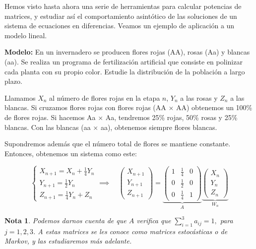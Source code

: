 \documentclass[11pt, a4paper]{article}
\newif\IfInSansMode
\numberwithin{equation}{section}
\theoremstyle{theorem-style}
\theoremstyle{definition-style}
\theoremstyle{remark-style}
\newtheorem*{nota}{Nota}
\theoremstyle{example-style}
\begin{document}
Hemos visto hasta ahora una serie de herramientas para calcular potencias de matrices, y estudiar así el comportamiento asintótico de las soluciones de un sistema de ecuaciones en diferencias. Veamos un ejemplo de aplicación a un modelo lineal.

\textbf{Modelo:} En un invernadero se producen flores rojas (AA), rosas (Aa) y blancas (aa). Se
realiza un programa de fertilización artificial que consiste en polinizar cada
planta con su propio color. Estudie la distribución de la población a largo
plazo.

Llamamos $X_n$ al número de flores rojas en la etapa $n$, $Y_n$ a las rosas y $Z_n$ a
las blancas. Si cruzamos flores rojas con flores rojas (AA $\times$ AA) obtenemos
un 100\% de flores rojas. Si hacemos Aa $\times$ Aa, tendremos 25\% rojas, 50\% rosas y
25\% blancas. Con las blancas (aa $\times$ aa), obtenemos siempre flores blancas.

Supondremos además que el número total de flores se mantiene constante. Entonces, obtenemos un sistema como este:

$$
\begin{cases}
  X_{n+1} = X_n + \frac{1}{4}Y_n \\
  Y_{n+1} = \frac{1}{2}Y_n \\
  Z_{n+1} = \frac{1}{4}Y_n + Z_n
\end{cases} \implies \quad \begin{pmatrix}
  X_{n+1} \\
  Y_{n+1} \\
  Z_{n+1}
\end{pmatrix} =
\underbrace{\begin{pmatrix}
  1 & \frac{1}{4} & 0 \\
  0 & \frac{1}{2} & 0 \\
  0 & \frac{1}{4} & 1
\end{pmatrix}}_A
\underbrace{\begin{pmatrix}
  X_n \\
  Y_n \\
  Z_n
\end{pmatrix}}_{W_n}$$

\begin{nota}
	Podemos darnos cuenta de que $A$ verifica que $\sum_{i=1}^3 a_{ij} = 1,$ para $j=1,2,3$. A estas matrices se les conoce como \textit{matrices estocásticas} o \textit{de Markov}, y las estudiaremos más adelante.
\end{nota}
\end{document}
